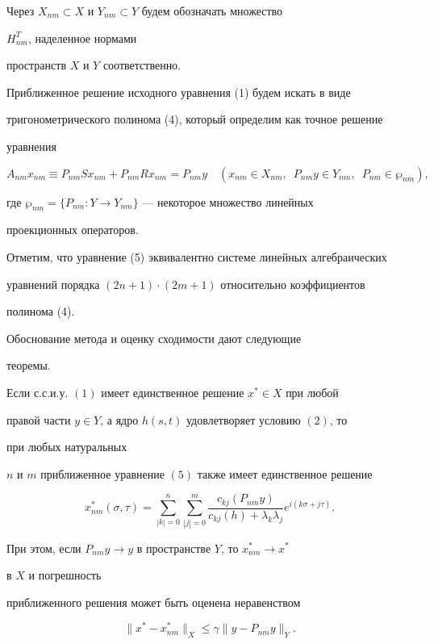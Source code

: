 Через $X_{nm}\subset X$ и $Y_{nm}\subset Y$ будем обозначать множество 


$H^T_{nm}$, наделенное нормами 


пространств $X$ и $Y$ соответственно. 


 


Приближенное решение исходного уравнения (1) будем искать в виде 


тригонометрического полинома (4), который определим как точное решение 


уравнения 


\begin{equation} 


A_{nm}x_{nm}\equiv P_{nm}S x_{nm}+P_{nm} 


R x_{nm}=P_{nm}y\quad(x_{nm}\in X_{nm},\ \; P_{nm}y\in Y_{nm}, 


\ \; P_{nm}\in\wp_{nm}), 


\end{equation} 


где $\wp_{nm}=\{P_{nm}:Y\to Y_{nm}\}$ --- некоторое множество линейных 


проекционных операторов. 


 


Отметим, что уравнение (5) эквивалентно системе линейных алгебраических 


уравнений порядка $(2n+1)\cdot(2m+1)$ относительно коэффициентов 


полинома (4). 


 


Обоснование метода и оценку сходимости дают следующие 


теоремы. 


 


\begin{thm} 


Если с.с.и.у. $(1)$ имеет единственное решение $x^*\in X$ при любой 


правой части $y\in Y$, а ядро $h(s,t)$ удовлетворяет условию $(2)$, то 


при любых натуральных 


$n$ и $m$ приближенное уравнение $(5)$ также имеет единственное решение 


$$ 


x^*_{nm}(\sigma,\tau)=\sum^n_{|k|=0}\sum^m_{|j|=0} 


\frac{c_{k j}(P_{nm}y)}{c_{k j}(h)+\lambda_k\lambda_j} 


e^{i(k\sigma+j\tau)}. 


$$ 


При этом, если $P_{nm}y\to y$ в пространстве $Y$, то $x^*_{nm}\to x^*$ 


в $X$ и погрешность 


приближенного решения может быть оценена неравенством 


$$ 


\|x^*-x^*_{nm}\|_X\le\gamma\|y-P_{nm}y\|_Y. 


$$ 


\end{thm} 


